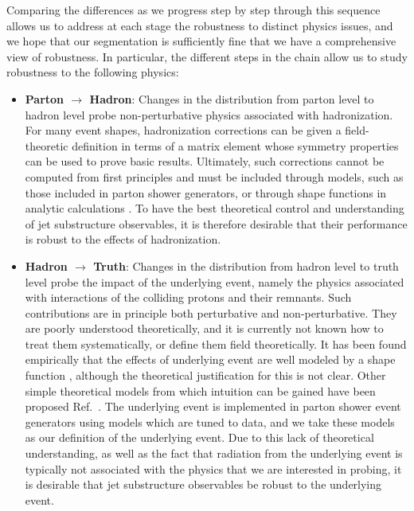 \documentclass[11pt,letterpaper]{article}
\begin{document}
Comparing the differences as we progress step by step through this sequence allows us to address at each stage the robustness to distinct physics issues, and we hope that our segmentation is sufficiently fine that we have a comprehensive view of robustness.
%
In particular, the different steps in the chain allow us to study robustness to the following physics: 
%
\begin{itemize}
%
\item {\bf Parton $\to$ Hadron}: Changes in the distribution from parton
  level to hadron level probe non-perturbative physics associated with
  hadronization.
  For many event shapes, hadronization corrections can
  be given a field-theoretic definition in terms of a matrix element
  whose symmetry properties can be used to prove basic
  results.
  Ultimately, such corrections cannot be computed
  from first principles and must be included through models, such as
  those included in parton shower generators, or through shape
  functions in analytic calculations
  \cite{Dokshitzer:1995qm,Dokshitzer:1995zt,Korchemsky:1999kt,Korchemsky:2000kp,Bosch:2004th,Hoang:2007vb,Ligeti:2008ac}.
    To have the best theoretical
  control and understanding of jet substructure observables, it is
  therefore desirable that their performance is robust to the effects
  of hadronization.
\item {\bf Hadron $\to$ Truth}: Changes in the distribution from hadron level to truth level probe the impact of the underlying event, namely the physics associated with interactions of the colliding protons and their remnants.
%
Such contributions are in principle both perturbative and non-perturbative.
%
They are poorly understood theoretically, and it is currently not known how to treat them systematically, or define them field theoretically.
%
It has been found empirically that the effects of underlying event are well modeled by a shape function \cite{Stewart:2014nna}, although the theoretical justification for this is not clear. Other simple theoretical models from which intuition can be gained have been proposed Ref.~\cite{Cacciari:2009dp}.
%
The underlying event is implemented in parton shower event generators using models which are tuned to data, and we take these models as our definition of the underlying event.
%
Due to this lack of theoretical understanding, as well as the fact that radiation from the underlying event is typically not associated with the physics that we are interested in probing, it is desirable that jet substructure observables be robust to the underlying event.

\end{itemize}
\end{document}
